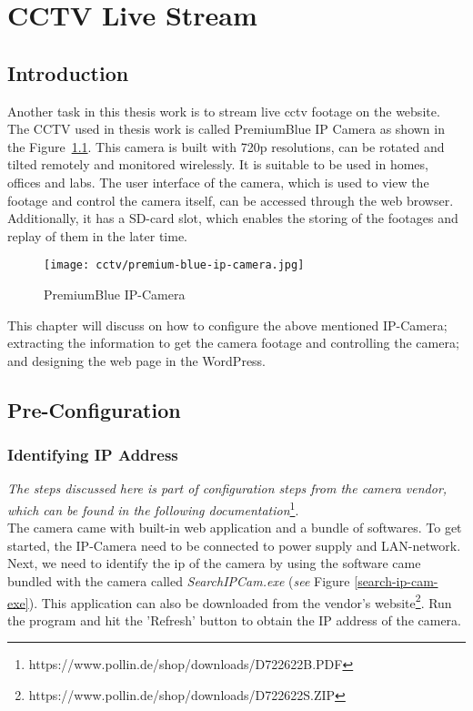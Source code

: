 \chapter{CCTV Live Stream}

\section{Introduction}
Another task in this thesis work is to stream live \ac{cctv} footage on the website. The CCTV used in thesis work is called PremiumBlue IP Camera as shown in the Figure~\ref{fig:premium-blue-ip-camera}. This camera is built with 720p resolutions, can be rotated and tilted remotely and monitored wirelessly. It is suitable to be used in homes, offices and labs. The user interface of the camera, which is used to view the footage and control the camera itself, can be accessed through the web browser. Additionally, it has a SD-card slot, which enables the storing of the footages and replay of them in the later time.

\begin{figure}[ht]
\caption{PremiumBlue IP-Camera}
\label{fig:premium-blue-ip-camera}
\centering
\texttt{[image: cctv/premium-blue-ip-camera.jpg]}
\end{figure}

This chapter will discuss on how to configure the above mentioned IP-Camera; extracting the information to get the camera footage and controlling the camera; and designing the web page in the WordPress.

\section{Pre-Configuration}
\subsection{Identifying IP Address}\label{sec:cctv-identifying-ip-address}
\emph{The steps discussed here is part of configuration steps from the camera vendor, which can be found in the following documentation}\footnote{https://www.pollin.de/shop/downloads/D722622B.PDF}.\\

The camera came with built-in web application and a bundle of softwares. To get started, the IP-Camera need to be connected to power supply and LAN-network. Next, we need to identify the \ac{ip} of the camera by using the software came bundled with the camera called \emph{SearchIPCam.exe} (\emph{see} Figure \ref{search-ip-cam-exe}). This application can also be downloaded from the vendor's website\footnote{https://www.pollin.de/shop/downloads/D722622S.ZIP}. Run the program and hit the 'Refresh' button to obtain the IP address of the camera.

